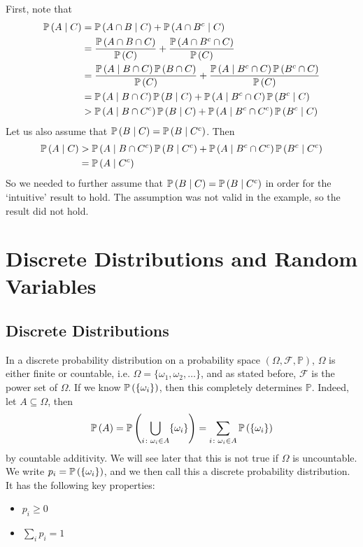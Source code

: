 \documentclass{article}
\begin{document}
First, note that
\begin{align*}
	\mathbb{P}\left({A \mid C}\right) & = \mathbb{P}\left({A \cap B \mid C}\right) + \mathbb{P}\left({A \cap {B}^c \mid C}\right)                                                                           \\
	                & = \frac{\mathbb{P}\left({A \cap B \cap C}\right)}{\mathbb{P}\left({C}\right)} + \frac{\mathbb{P}\left({A \cap {B}^c \cap C}\right)}{\mathbb{P}\left({C}\right)}                                         \\
	                & = \frac{\mathbb{P}\left({A \mid B \cap C}\right) \mathbb{P}\left({B \cap C}\right)}{\mathbb{P}\left({C}\right)} + \frac{\mathbb{P}\left({A \mid {B}^c \cap C}\right)\mathbb{P}\left({{B}^c \cap C}\right)}{\mathbb{P}\left({C}\right)} \\
	                & = \mathbb{P}\left({A \mid B \cap C}\right) \mathbb{P}\left({B \mid C}\right) + \mathbb{P}\left({A \mid {B}^c \cap C}\right) \mathbb{P}\left({{B}^c \mid C}\right)                                  \\
	                & > \mathbb{P}\left({A \mid B \cap {C}^c}\right) \mathbb{P}\left({B \mid C}\right) + \mathbb{P}\left({A \mid {B}^c \cap {C}^c}\right) \mathbb{P}\left({{B}^c \mid C}\right)
\end{align*}
Let us also assume that $\mathbb{P}\left({B \mid C}\right) = \mathbb{P}\left({B \mid {C}^c}\right)$. Then
\begin{align*}
	\mathbb{P}\left({A \mid C}\right) & > \mathbb{P}\left({A \mid B \cap {C}^c}\right) \mathbb{P}\left({B \mid {C}^c}\right) + \mathbb{P}\left({A \mid {B}^c \cap {C}^c}\right) \mathbb{P}\left({{B}^c \mid {C}^c}\right) \\
	                & = \mathbb{P}\left({A \mid {C}^c}\right)
\end{align*}
So we needed to further assume that $\mathbb{P}\left({B \mid C}\right) = \mathbb{P}\left({B \mid {C}^c}\right)$ in order for the `intuitive' result to hold. The assumption was not valid in the example, so the result did not hold.

\section{Discrete Distributions and Random Variables}
\subsection{Discrete Distributions}
In a discrete probability distribution on a probability space $(\Omega, \mathcal F, \mathbb P)$, $\Omega$ is either finite or countable, i.e. $\Omega = \{ \omega_1, \omega_2, \dots \}$, and as stated before, $\mathcal F$ is the power set of $\Omega$. If we know $\mathbb{P}\left({\{\omega_i\}}\right)$, then this completely determines $\mathbb P$. Indeed, let $A \subseteq \Omega$, then
\[ \mathbb{P}\left({A}\right) = \mathbb{P}\left({\bigcup_{i \colon \omega_i \in A} \{ \omega_i \}}\right) = \sum_{i \colon \omega_i \in A}\mathbb{P}\left({\{\omega_i\}}\right) \]
by countable additivity. We will see later that this is not true if $\Omega$ is uncountable. We write $p_i = \mathbb{P}\left({\{\omega_i\}}\right)$, and we then call this a discrete probability distribution. It has the following key properties:
\begin{itemize}
	\item $p_i \geq 0$
	\item $\sum_i p_i = 1$
\end{itemize}
\end{document}
